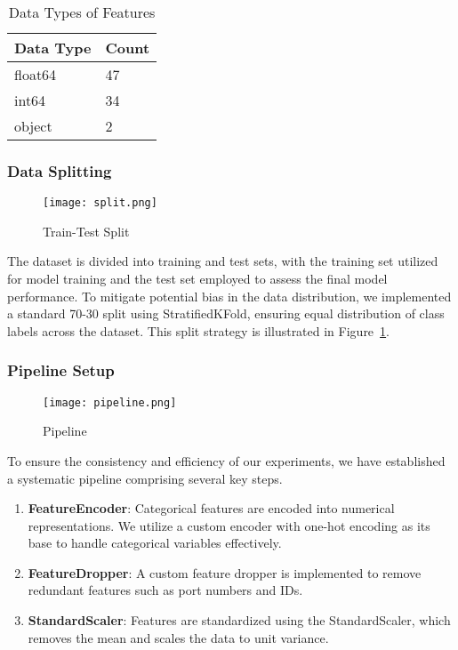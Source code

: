 \documentclass[a4paper,10pt,twocolumn]{article}
\begin{document}
\begin{table}[h!]
\caption{Data Types of Features}
\begin{center}
\begin{tabular}{|l|l|}
\hline
\textbf{Data Type} & \textbf{Count} \\ \hline
float64 & 47 \\
int64 & 34 \\
object & 2 \\ \hline
\end{tabular}
\end{center}
\label{tab:dt}
\end{table}

\subsubsection{Data Splitting}

\begin{figure}[h!t]
    \centering
    \texttt{[image: split.png]}%
    \caption{Train-Test Split}
    \label{fig:split}
\end{figure}

The dataset is divided into training and test sets, with the training set utilized for model training and the test set employed to assess the final model performance. To mitigate potential bias in the data distribution, we implemented a standard 70-30 split using StratifiedKFold, ensuring equal distribution of class labels across the dataset. This split strategy is illustrated in Figure~\ref{fig:split}.

\subsubsection{Pipeline Setup}

\begin{figure}[h!t]
    \centering
    \texttt{[image: pipeline.png]}%
    \caption{Pipeline}
    \label{fig:pipeline}
\end{figure}

To ensure the consistency and efficiency of our experiments, we have established a systematic pipeline comprising several key steps.

\begin{enumerate}
    \item \textbf{FeatureEncoder}: Categorical features are encoded into numerical representations. We utilize a custom encoder with one-hot encoding as its base to handle categorical variables effectively.
    
    \item \textbf{FeatureDropper}: A custom feature dropper is implemented to remove redundant features such as port numbers and IDs.
    
    \item \textbf{StandardScaler}: Features are standardized using the StandardScaler, which removes the mean and scales the data to unit variance.
\end{enumerate}
\end{document}
